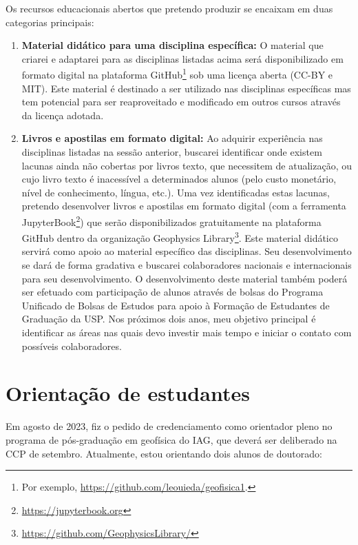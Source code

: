 \documentclass[12pt,a4paper,oneside]{book}
\begin{document}
Os recursos educacionais abertos que pretendo produzir se encaixam em duas
categorias principais:

\begin{enumerate}
  \item \textbf{Material didático para uma disciplina específica:} O material
    que criarei e adaptarei para as disciplinas listadas acima será
    disponibilizado em formato digital na plataforma GitHub\footnote{Por exemplo,
    \url{https://github.com/leouieda/geofisica1}.} sob uma licença aberta (CC-BY
    e MIT). Este material é destinado a ser utilizado nas disciplinas
    específicas mas tem potencial para ser reaproveitado e modificado em outros
    cursos através da licença adotada.
  \item \textbf{Livros e apostilas em formato digital:}
    Ao adquirir experiência nas disciplinas listadas na sessão anterior,
    buscarei identificar onde existem lacunas ainda não cobertas por livros
    texto, que necessitem de atualização, ou cujo livro texto é inacessível a
    determinados alunos (pelo custo monetário, nível de conhecimento, língua,
    etc.). Uma vez identificadas estas lacunas, pretendo desenvolver livros e
    apostilas em formato digital (com a ferramenta
    JupyterBook\footnote{\url{https://jupyterbook.org}}) que serão
    disponibilizados gratuitamente na plataforma GitHub dentro da organização
    Geophysics Library\footnote{\url{https://github.com/GeophysicsLibrary/}}.
    Este material didático servirá como apoio ao material específico das
    disciplinas. Seu desenvolvimento se dará de forma gradativa e buscarei
    colaboradores nacionais e internacionais para seu desenvolvimento.
    O desenvolvimento deste material também poderá ser efetuado com
    participação de alunos através de bolsas do Programa Unificado de Bolsas de
    Estudos para apoio à Formação de Estudantes de Graduação da USP. Nos
    próximos dois anos, meu objetivo principal é identificar as áreas nas quais
    devo investir mais tempo e iniciar o contato com possíveis colaboradores.
\end{enumerate}


\section{Orientação de estudantes}

Em agosto de 2023, fiz o pedido de credenciamento como orientador pleno no
programa de pós-graduação em geofísica do IAG, que deverá ser deliberado
na CCP de setembro.
Atualmente, estou orientando dois alunos de doutorado:
\end{document}
